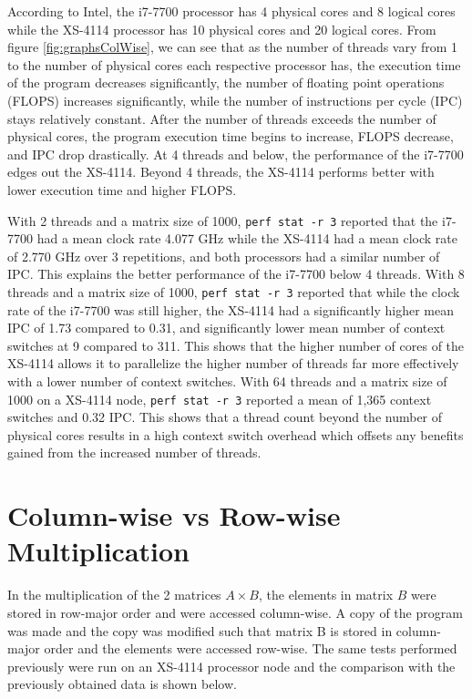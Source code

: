 \documentclass{article}
\begin{document}
According to Intel, the i7-7700 processor has 4 physical cores and 8 logical cores while the XS-4114 processor has 10 physical cores and 20 logical cores. From figure \ref{fig:graphsColWise}, we can see that as the number of threads vary from 1 to the number of physical cores each respective processor has, the execution time of the program decreases significantly, the number of floating point operations (FLOPS) increases significantly, while the number of instructions per cycle (IPC) stays relatively constant. After the number of threads exceeds the number of physical cores, the program execution time begins to increase, FLOPS decrease, and IPC drop drastically. At 4 threads and below, the performance of the i7-7700 edges out the XS-4114. Beyond 4 threads, the XS-4114 performs better with lower execution time and higher FLOPS.

With 2 threads and a matrix size of 1000, \texttt{perf stat -r 3} reported that the i7-7700 had a mean clock rate 4.077 GHz while the XS-4114 had a mean clock rate of 2.770 GHz over 3 repetitions, and both processors had a similar number of IPC. This explains the better performance of the i7-7700 below 4 threads. With 8 threads and a matrix size of 1000, \texttt{perf stat -r 3} reported that while the clock rate of the i7-7700 was still higher, the XS-4114 had a significantly higher mean IPC of 1.73 compared to 0.31, and significantly lower mean number of context switches at 9 compared to 311. This shows that the higher number of cores of the XS-4114 allows it to parallelize the higher number of threads far more effectively with a lower number of context switches. With 64 threads and a matrix size of 1000 on a XS-4114 node, \texttt{perf stat -r 3} reported a mean of 1,365 context switches and 0.32 IPC. This shows that a thread count beyond the number of physical cores results in a high context switch overhead which offsets any benefits gained from the increased number of threads.

\section{Column-wise vs Row-wise Multiplication}
In the multiplication of the 2 matrices $A \times B$, the elements in matrix $B$ were stored in row-major order and were accessed column-wise. A copy of the program was made and the copy was modified such that matrix B is stored in column-major order and the elements were accessed row-wise. The same tests performed previously were run on an XS-4114 processor node and the comparison with the previously obtained data is shown below.  
\end{document}
